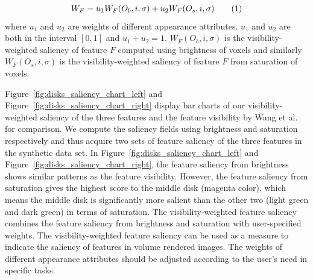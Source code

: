 
\[ W_{F}=u_{1}W_{F}(O_{b},i,\sigma)+u_{2}W_{F}(O_{s},i,\sigma)
\addtag \]
where $ u_{1}$ and $ u_{2}$ are weights of different appearance attributes. $ u_{1}$ and $ u_{2}$ are both in the interval $[0,1] $ and $ u_{1}+u_{2}=1 $. $ W_{F}(O_{b},i,\sigma) $ is the visibility-weighted saliency of feature $ F $ computed using brightness of voxels and similarly $ W_{F}(O_{s},i,\sigma) $ is the visibility-weighted saliency of feature $ F $ from saturation of voxels.

Figure~\ref{fig:disks_saliency_chart_left} and Figure~\ref{fig:disks_saliency_chart_right} display bar charts of our visibility-weighted saliency of the three features and the feature visibility by Wang et al. \cite{wang_efficient_2011} for comparison.
We compute the saliency fields using brightness and saturation respectively and thus acquire two sets of feature saliency of the three features in the synthetic data set.
In Figure~\ref{fig:disks_saliency_chart_left} and Figure~\ref{fig:disks_saliency_chart_right}, the feature saliency from brightness shows similar patterns as the feature visibility. However, the feature saliency from saturation gives the highest score to the middle disk (magenta color), which means the middle disk is significantly more salient than the other two (light green and dark green) in terms of saturation. The visibility-weighted feature saliency combines the feature saliency from brightness and saturation with user-specified weights. 
The visibility-weighted feature saliency can be used as a measure to indicate the saliency of features in volume rendered images.
The weights of different appearance attributes should be adjusted according to the user's need in specific tasks.

